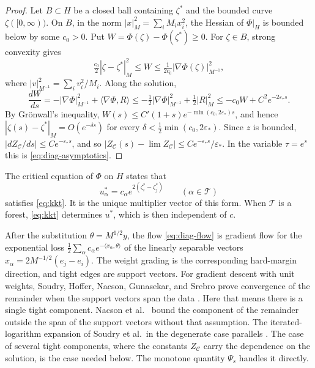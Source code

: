 \begin{proof}
Let $B\subset H$ be a closed ball containing $\zeta^*$ and the bounded curve
$\zeta([0,\infty))$. On $B$, in the norm $|x|_M^2=\sum_iM_ix_i^2$, the
Hessian of $\Phi|_H$ is bounded below by some $c_0>0$. Put
$W=\Phi(\zeta)-\Phi(\zeta^*)\ge0$. For $\zeta\in B$, strong convexity gives
\[
 \tfrac{c_0}2|\zeta-\zeta^*|_M^2\le W\le\tfrac1{2c_0}|\nabla\Phi(\zeta)|_{M^{-1}}^2,
\]
where $|v|_{M^{-1}}^2=\sum_iv_i^2/M_i$. Along the solution,
\[
 \frac{dW}{ds}=-|\nabla\Phi|_{M^{-1}}^2+\langle\nabla\Phi,R\rangle
 \le-\tfrac12|\nabla\Phi|_{M^{-1}}^2+\tfrac12|R|_M^2
 \le-c_0W+C^2e^{-2\varepsilon_*s}.
\]
By Gr\"onwall's inequality, $W(s)\le C'(1+s)e^{-\min(c_0,2\varepsilon_*)s}$,
and hence $|\zeta(s)-\zeta^*|_M=O(e^{-\delta s})$ for every
$\delta<\frac12\min(c_0,2\varepsilon_*)$. Since $z$ is bounded,
$|dZ_{\mathcal C}/ds|\le Ce^{-\varepsilon_*s}$, and so
$|Z_{\mathcal C}(s)-\lim Z_{\mathcal C}|\le Ce^{-\varepsilon_*s}/\varepsilon_*$.
In the variable $\tau=e^s$ this is \eqref{eq:diag-asymptotics}.
\end{proof}

The critical equation of $\Phi$ on $H$ states that
\begin{equation}\label{eq:ustar}
 u^*_\alpha=c_\alpha e^{2(\zeta^*_i-\zeta^*_j)}\qquad(\alpha\in\mathcal T)
\end{equation}
satisfies \eqref{eq:kkt}. It is the unique multiplier vector of this form.
When $\mathcal T$ is a forest, \eqref{eq:kkt} determines $u^*$, which is then
independent of $c$.

\begin{remark}\label{rem:implicit-bias}
After the substitution $\theta=M^{1/2}y$, the flow \eqref{eq:diag-flow} is
gradient flow for the exponential loss $\frac12\sum_\alpha c_\alpha
e^{-\langle x_\alpha,\theta\rangle}$ of the linearly separable vectors
$x_\alpha=2M^{-1/2}(e_j-e_i)$. The weight grading is the corresponding
hard-margin direction, and tight edges are support vectors. For gradient
descent with unit weights, Soudry, Hoffer, Nacson, Gunasekar, and Srebro
prove convergence of the remainder when the support vectors span the data
\cite[Theorems~3 and~4]{Soudry2018}. Here that means there is a single tight
component. Nacson et al.\ \cite[Theorem~10]{Nacson2019} bound the component
of the remainder outside the span of the support vectors without that
assumption. The iterated-logarithm expansion of Soudry et al.\ in the degenerate case
\cite[Theorem~13]{Soudry2018} parallels \cite[Section~5]{HKKP2023}. The
case of several tight components, where the constants $Z_{\mathcal C}$ carry the
dependence on the solution, is the case needed below. The monotone quantity
$\Psi_s$ handles it directly.
\end{remark}


